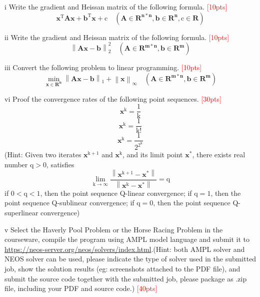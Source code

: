 \begin{center}\begin{LARGE} \end{LARGE}\end{center}
 
\begin{problem}{i}
Write the gradient and Heissan matrix of the following formula.
\textcolor{red}{[10pts]}$$\mathbf{x}^{\mathrm{T}}\mathbf{Ax}+\mathbf{b}^{\mathrm{T}}\mathbf{x}+\mathrm{c}\quad(\mathbf{A}\in\mathbf{R^{n*n}}, \mathbf{b}\in\mathbf{R^{n}}, \mathrm{c}\in\mathbf{R})$$
\end{problem}

    
\begin{problem}{ii}
Write the gradient and Heissan matrix of the following formula.
\textcolor{red}{[10pts]}$$\left\|\mathbf{Ax}-\mathbf{b}\right\|^{2}_{2}\quad(\mathbf{A}\in\mathbf{R^{m*n}}, \mathbf{b}\in\mathbf{R^{m}})$$
\end{problem}
    
    
\begin{problem}{iii}
Convert the following problem to linear programming.
\textcolor{red}{[10pts]}$$\min_{\mathbf{x}\in\mathbf{R^{n}}}\left\|\mathbf{Ax}-\mathbf{b}\right\|_{1}+\left\|\mathbf{x}\right\|_{\infty}\quad(\mathbf{A}\in\mathbf{R^{m*n}}, \mathbf{b}\in\mathbf{R^{m}})$$
\end{problem}
    

\begin{problem}{vi}
Proof the convergence rates of the following point sequences.
\textcolor{red}{[30pts]}$$\mathbf{x^{\mathrm{k}}}=\frac{\mathrm{1}}{\mathrm{k}}$$$$\mathbf{x^{\mathrm{k}}}=\frac{\mathrm{1}}{\mathrm{k!}}$$$$\mathbf{x^{\mathrm{k}}}=\frac{\mathrm{1}}{\mathrm{2^{2^{k}}}}$$(Hint: Given two iterates $\mathbf{x^{\mathrm{k+1}}}$ and $\mathbf{x^{\mathrm{k}}}$, and its limit point $\mathbf{x^{\mathrm{*}}}$, there exists real number $\mathrm{q > 0}$, satisfies $$\lim_{\mathrm{k\rightarrow\infty}}\frac{\left\|\mathbf{x^{\mathrm{k+1}}}-\mathbf{x^{\mathrm{*}}}\right\|}{\left\|\mathbf{x^{\mathrm{k}}}-\mathbf{x^{\mathrm{*}}}\right\|} = \mathrm{q}$$ if $\mathrm{0<q<1}$, then the point sequence Q-linear convergence; if $\mathrm{q=1}$, then the point sequence Q-sublinear convergence; if $\mathrm{q=0}$, then the point sequence Q-superlinear convergence)
\end{problem}
    
    
\begin{problem}{v}
Select the Haverly Pool Problem or the Horse Racing Problem in the courseware, compile the program using AMPL model language and submit it to \url{https://neos-server.org/neos/solvers/index.html}.(Hint: both AMPL solver and NEOS solver can be used, please indicate the type of solver used in the submitted job, show the solution results (eg: screenshots attached to the PDF file), and submit the source code together with the submitted job, please package as .zip file, including your PDF and source code.)
\textcolor{red}{[40pts]}
\end{problem}
    
